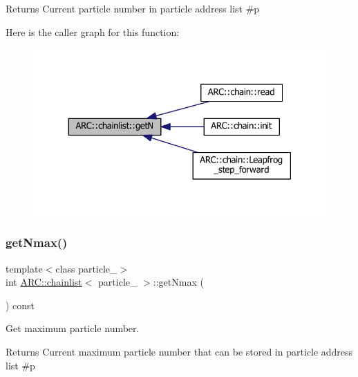 \begin{DoxyReturn}{Returns}
Current particle number in particle address list \#p 
\end{DoxyReturn}
Here is the caller graph for this function\+:
\nopagebreak
\begin{figure}[H]
\begin{center}
\leavevmode
\includegraphics[width=330pt]{classARC_1_1chainlist_a461f4b2936307305b9092a4f81197e6b_icgraph}
\end{center}
\end{figure}
\hypertarget{classARC_1_1chainlist_a2e84ca6cff1c7be965b7771483415573}{}\label{classARC_1_1chainlist_a2e84ca6cff1c7be965b7771483415573} 
\subsubsection{\texorpdfstring{get\+Nmax()}{getNmax()}}
{\footnotesize\ttfamily template$<$class particle\+\_\+$>$ \\
int \hyperlink{classARC_1_1chainlist}{A\+R\+C\+::chainlist}$<$ particle\+\_\+ $>$\+::get\+Nmax (\begin{DoxyParamCaption}{ }\end{DoxyParamCaption}) const\hspace{0.3cm}{\ttfamily [inline]}}



Get maximum particle number. 

\begin{DoxyReturn}{Returns}
Current maximum particle number that can be stored in particle address list \#p 
\end{DoxyReturn}
\hypertarget{classARC_1_1chainlist_a0e2f35b8eabe9d9ecd77ed9f24e083de}{}\label{classARC_1_1chainlist_a0e2f35b8eabe9d9ecd77ed9f24e083de} 
